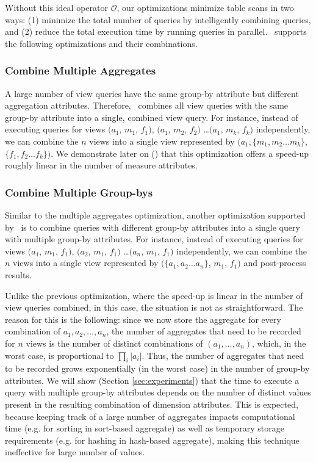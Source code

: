 Without this ideal operator $\mathcal{O}$,
our optimizations minimize table scans in two ways: (1) minimize the total number of
queries by intelligently combining queries, and (2) reduce the total
execution time by running queries in parallel. \VizRecDB\ supports the following
optimizations and their combinations.

\subsubsection {Combine Multiple Aggregates} 
A large number of view queries have the same group-by attribute but different
aggregation attributes. 
Therefore, \VizRecDB\ combines all view queries with the same
group-by attribute into a single, combined view query. For instance, instead of executing
queries for views $(a_1$, $m_1$, $f_1)$, $(a_1$, $m_2$, $f_2)$ \ldots $(a_1$, $m_k$, $f_k)$
independently, we can combine the $n$ views into a single view represented by
$(a_1, \{m_1, m_2\ldots m_k\}$, $\{f_1, f_2\ldots f_k\})$. We demonstrate later on 
()
that this optimization offers a speed-up roughly linear in the number of measure
attributes.

\subsubsection {Combine Multiple Group-bys}
\label{subsec:mult_gb}
  Similar to the multiple aggregates optimization, another optimization
  supported by \VizRecDB\ is to combine queries with different group-by attributes
  into a single query with multiple group-by attributes.
  For instance, instead of executing queries for views $(a_1$, $m_1$, $f_1)$,
  $(a_2$, $m_1$, $f_1)$ \ldots $(a_n$, $m_1$, $f_1)$ independently, we can
  combine the $n$ views into a single view represented by $(\{a_1, a_2\ldots
  a_n\}$, $m_1$, $f_1)$ and post-process results.

Unlike the previous optimization, where the speed-up is linear in the number of 
view queries combined, in this case, the situation is not as straightforward. 
The reason for this is the following:
since we now store the aggregate for every combination
of $a_1, a_2, \ldots, a_n$, 
the number of aggregates that need to be recorded for 
$n$ views is the number of distinct combinations
of $(a_1, \ldots, a_n)$, which, in the worst case, 
is proportional to $\prod_i |a_i|$.
Thus, the number of aggregates that need to be recorded 
grows exponentially (in the worst case) in the
number of group-by attributes. 
We will show (Section \ref{sec:experiments}) that 
the time to execute a query with multiple group-by attributes
depends on the number of distinct values present in the resulting 
combination of dimension attributes. 
This is expected, because keeping track of a large number
of aggregates impacts computational time (e.g. for sorting in sort-based aggregate)
as well as temporary storage requirements (e.g. for hashing in hash-based
aggregate), making this technique ineffective for large number of values.

